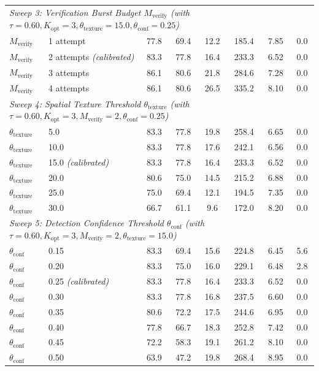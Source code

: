 \documentclass[final,5p,times,twocolumn,authoryear]{elsarticle}
\begin{document}
\begin{table}[t]
\begin{tabular}{llcccccc}
\midrule
\multicolumn{8}{l}{\textit{Sweep 3: Verification Burst Budget $M_{\text{verify}}$ (with $\tau=0.60, K_{\text{opt}}=3, \theta_{\text{texture}}=15.0, \theta_{\text{conf}}=0.25$)}} \\
$M_{\text{verify}}$ & 1 attempt & 77.8 & 69.4 & 12.2 & 185.4 & 7.85 & 0.0 \\
$M_{\text{verify}}$ & 2 attempts \textit{(calibrated)} & 83.3 & 77.8 & 16.4 & 233.3 & 6.52 & 0.0 \\
$M_{\text{verify}}$ & 3 attempts & 86.1 & 80.6 & 21.8 & 284.6 & 7.28 & 0.0 \\
$M_{\text{verify}}$ & 4 attempts & 86.1 & 80.6 & 26.5 & 335.2 & 8.10 & 0.0 \\
\midrule
\multicolumn{8}{l}{\textit{Sweep 4: Spatial Texture Threshold $\theta_{\text{texture}}$ (with $\tau=0.60, K_{\text{opt}}=3, M_{\text{verify}}=2, \theta_{\text{conf}}=0.25$)}} \\
$\theta_{\text{texture}}$ & 5.0 & 83.3 & 77.8 & 19.8 & 258.4 & 6.65 & 0.0 \\
$\theta_{\text{texture}}$ & 10.0 & 83.3 & 77.8 & 17.6 & 242.1 & 6.56 & 0.0 \\
$\theta_{\text{texture}}$ & 15.0 \textit{(calibrated)} & 83.3 & 77.8 & 16.4 & 233.3 & 6.52 & 0.0 \\
$\theta_{\text{texture}}$ & 20.0 & 80.6 & 75.0 & 14.5 & 215.2 & 6.88 & 0.0 \\
$\theta_{\text{texture}}$ & 25.0 & 75.0 & 69.4 & 12.1 & 194.5 & 7.35 & 0.0 \\
$\theta_{\text{texture}}$ & 30.0 & 66.7 & 61.1 & 9.6 & 172.0 & 8.20 & 0.0 \\
\midrule
\multicolumn{8}{l}{\textit{Sweep 5: Detection Confidence Threshold $\theta_{\text{conf}}$ (with $\tau=0.60, K_{\text{opt}}=3, M_{\text{verify}}=2, \theta_{\text{texture}}=15.0$)}} \\
$\theta_{\text{conf}}$ & 0.15 & 83.3 & 69.4 & 15.6 & 224.8 & 6.45 & 5.6 \\
$\theta_{\text{conf}}$ & 0.20 & 83.3 & 75.0 & 16.0 & 229.1 & 6.48 & 2.8 \\
$\theta_{\text{conf}}$ & 0.25 \textit{(calibrated)} & 83.3 & 77.8 & 16.4 & 233.3 & 6.52 & 0.0 \\
$\theta_{\text{conf}}$ & 0.30 & 83.3 & 77.8 & 16.8 & 237.5 & 6.60 & 0.0 \\
$\theta_{\text{conf}}$ & 0.35 & 80.6 & 72.2 & 17.5 & 244.6 & 6.95 & 0.0 \\
$\theta_{\text{conf}}$ & 0.40 & 77.8 & 66.7 & 18.3 & 252.8 & 7.42 & 0.0 \\
$\theta_{\text{conf}}$ & 0.45 & 72.2 & 58.3 & 19.1 & 261.2 & 8.10 & 0.0 \\
$\theta_{\text{conf}}$ & 0.50 & 63.9 & 47.2 & 19.8 & 268.4 & 8.95 & 0.0 \\
\bottomrule
\end{tabular}
\end{table}
\end{document}
